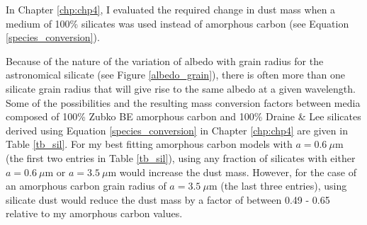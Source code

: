 In Chapter \ref{chp:chp4}, I evaluated the required change in dust mass when a medium of 100\% 
silicates was used instead of amorphous carbon (see Equation \ref{species_conversion}). 
%

Because of the nature of the variation of albedo with grain radius for the 
\citet{Draine1984} astronomical silicate (see Figure \ref{albedo_grain}), 
there is often more than one silicate grain radius that will give rise to 
the same albedo at a given wavelength.  Some of the possibilities and the 
resulting mass conversion factors between media composed of 100\% Zubko BE amorphous carbon and 100\% Draine \& Lee silicates derived using Equation \ref{species_conversion} in Chapter \ref{chp:chp4} are given in Table \ref{tb_sil}.  For 
my best fitting amorphous carbon models with $a=0.6~\mu$m (the first two 
entries in Table \ref{tb_sil}), using any fraction of silicates with 
either $a=0.6~\mu$m or $a=3.5~\mu$m would increase the dust mass.  
However, 
for the case of an amorphous carbon grain radius of $a=3.5~\mu$m (the last 
three entries), using silicate dust would reduce the dust mass by a factor 
of between 0.49 - 0.65 relative to my amorphous carbon values.

